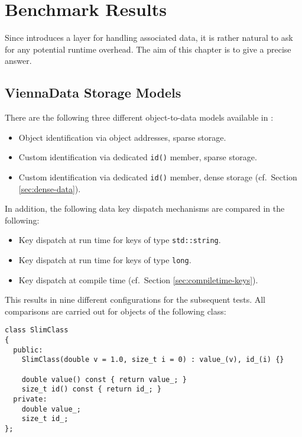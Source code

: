 \chapter{Benchmark Results} \label{chap:benchmarks}
Since {\ViennaData} introduces a layer for handling associated data, it is rather
natural to ask for any potential runtime overhead. The aim of this
chapter is to give a precise answer.

\section{ViennaData Storage Models}
There are the following three different object-to-data models available in {\ViennaData}:
\begin{itemize}
 \item Object identification via object addresses, sparse storage.
 \item Custom identification via dedicated \lstinline|id()| member, sparse storage.
 \item Custom identification via dedicated \lstinline|id()| member, dense storage (cf.~Section \ref{sec:dense-data}).
\end{itemize}
In addition, the following data key dispatch mechanisms are compared in the following:
\begin{itemize}
 \item Key dispatch at run time for keys of type \lstinline|std::string|.
 \item Key dispatch at run time for keys of type \lstinline|long|.
 \item Key dispatch at compile time (cf.~Section \ref{sec:compiletime-keys}).
\end{itemize}
This results in nine different configurations for the subsequent tests. All comparisons are carried out for objects of the following class:
\begin{lstlisting}
class SlimClass
{
  public:
    SlimClass(double v = 1.0, size_t i = 0) : value_(v), id_(i) {}
    
    double value() const { return value_; }
    size_t id() const { return id_; }
  private:
    double value_;
    size_t id_;
};
\end{lstlisting}

